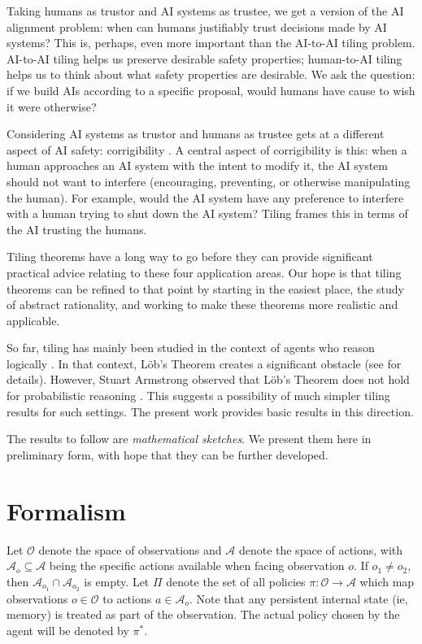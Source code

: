 \documentclass{article}
\begin{document}
Taking humans as trustor and AI systems as trustee, we get a version of the AI alignment problem: when can humans justifiably trust decisions made by AI systems? This is, perhaps, even more important than the AI-to-AI tiling problem. AI-to-AI tiling helps us preserve desirable safety properties; human-to-AI tiling helps us to think about what safety properties are desirable. We ask the question: if we build AIs according to a specific proposal, would humans have cause to wish it were otherwise?

Considering AI systems as trustor and humans as trustee gets at a different aspect of AI safety: corrigibility \cite{Soares2015Corrigibility}. A central aspect of corrigibility is this: when a human approaches an AI system with the intent to modify it, the AI system should not want to interfere (encouraging, preventing, or otherwise manipulating the human). For example, would the AI system have any preference to interfere with a human trying to shut down the AI system? \cite{thornley2024shutdown} Tiling frames this in terms of the AI trusting the humans.

Tiling theorems have a long way to go before they can provide significant practical advice relating to these four application areas. Our hope is that tiling theorems can be refined to that point by starting in the easiest place, the study of abstract rationality, and working to make these theorems more realistic and applicable.

So far, tiling has mainly been studied in the context of agents who reason logically \cite{yudkowsky2013tiling}. In that context, L{\"o}b's Theorem creates a significant obstacle (see \cite{yudkowsky2013tiling} for details). However, Stuart Armstrong observed that L{\"o}b's Theorem does not hold for probabilistic reasoning \cite{armstrong2013loeb}. This suggests a possibility of much simpler tiling results for such settings. The present work provides basic results in this direction.

The results to follow are \emph{mathematical sketches}. We present them here in preliminary form, with hope that they can be further developed. 

\section{Formalism}

Let $\mathcal{O}$ denote the space of observations and $\mathcal{A}$ denote the space of actions, with $\mathcal{A}_o \subseteq \mathcal{A}$ being the specific actions available when facing observation $o$. If $o_1 \neq o_2$, then $\mathcal{A}_{o_1} \cap \mathcal{A}_{o_2}$ is empty. Let $\Pi$ denote the set of all policies $\pi: \mathcal{O} \to \mathcal{A}$ which map observations $o \in \mathcal{O}$ to actions $a \in \mathcal{A}_o$. Note that any persistent internal state (ie, memory) is treated as part of the observation. The actual policy chosen by the agent will be denoted by $\pi^*$.
\end{document}
